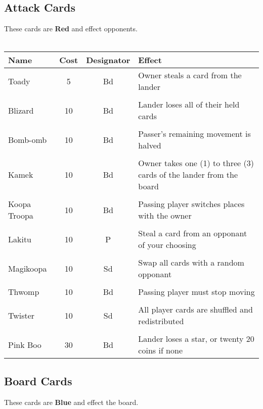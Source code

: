 \documentclass{article}
\begin{document}
\subsection{Attack Cards}

These cards are \textbf{Red} and effect opponents.
\\\\

\begin{tabular}{lccp{5cm}}
\textbf{Name} & \textbf{Cost} & \textbf{Designator} & \textbf{Effect} \\
\hline
Toady & 5 & Bd & Owner steals a card from the lander \\
&&& \\
Blizard & 10 & Bd & Lander loses all of their held cards \\
&&& \\
Bomb-omb & 10 & Bd & Passer's remaining movement is halved \\
&&& \\
Kamek & 10 & Bd & Owner takes one (1) to three (3) cards of the lander from the board \\
&&& \\
Koopa Troopa & 10 & Bd & Passing player switches places with the owner \\
&&& \\
Lakitu & 10 & P & Steal a card from an opponant of your choosing \\
&&& \\
Magikoopa & 10 & Sd & Swap all cards with a random opponant \\
&&& \\
Thwomp & 10 & Bd & Passing player must stop moving \\
&&& \\
Twister & 10 & Sd & All player cards are shuffled and redistributed \\
&&& \\
Pink Boo & 30 & Bd & Lander loses a star, or twenty 20 coins if none \\
\end{tabular}

\subsection{Board Cards}

These cards are \textbf{Blue} and effect the board.
\\\\
\end{document}
